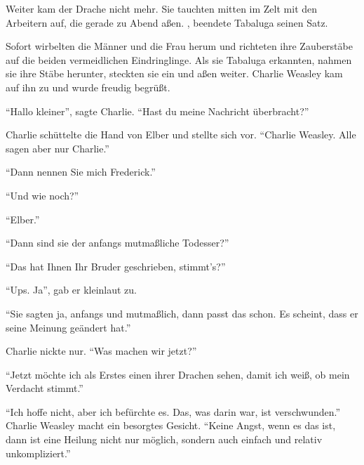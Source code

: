 



 Weiter kam der Drache nicht mehr.  Sie tauchten mitten im Zelt mit den Arbeitern auf, die gerade zu Abend aßen. , beendete Tabaluga seinen Satz.

Sofort wirbelten die Männer und die Frau herum und richteten ihre Zauberstäbe auf die beiden vermeidlichen Eindringlinge. Als sie Tabaluga erkannten, nahmen sie ihre Stäbe herunter, steckten sie ein und aßen weiter. Charlie Weasley kam auf ihn zu und wurde freudig begrüßt.

\enquote{Hallo kleiner}, sagte Charlie. \enquote{Hast du meine Nachricht überbracht?}


Charlie schüttelte die Hand von Elber und stellte sich vor. \enquote{Charlie Weasley. Alle sagen aber nur Charlie.}

\enquote{Dann nennen Sie mich Frederick.}

\enquote{Und wie noch?}

\enquote{Elber.}

\enquote{Dann sind sie der anfangs mutmaßliche Todesser?}

\enquote{Das hat Ihnen Ihr Bruder geschrieben, stimmt’s?}

\enquote{Ups. Ja}, gab er kleinlaut zu.

\enquote{Sie sagten ja, anfangs und mutmaßlich, dann passt das schon. Es scheint, dass er seine Meinung geändert hat.}

Charlie nickte nur. \enquote{Was machen wir jetzt?}

\enquote{Jetzt möchte ich als Erstes einen ihrer Drachen sehen, damit ich weiß, ob mein Verdacht stimmt.}


\enquote{Ich hoffe nicht, aber ich befürchte es. Das, was darin war, ist verschwunden.} Charlie Weasley macht ein besorgtes Gesicht. \enquote{Keine Angst, wenn es das ist, dann ist eine Heilung nicht nur möglich, sondern auch einfach und relativ unkompliziert.}

